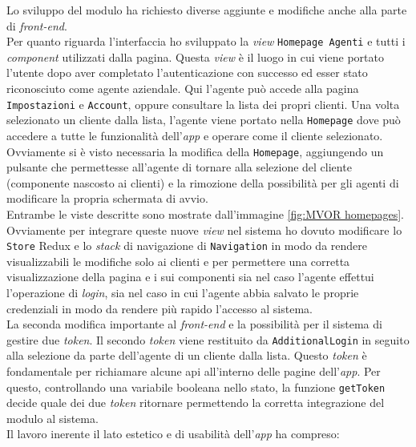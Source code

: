 Lo sviluppo del modulo ha richiesto diverse aggiunte e modifiche anche alla parte di \textit{front-end}.\\
Per quanto riguarda l'interfaccia ho sviluppato la \textit{view} \texttt{Homepage Agenti} e tutti i 
\textit{component} utilizzati dalla pagina. Questa \textit{view} è il luogo in cui viene portato l'utente 
dopo aver completato l'autenticazione con successo ed esser stato riconosciuto come agente aziendale. Qui 
l'agente può accede alla pagina \texttt{Impostazioni} e \texttt{Account}, oppure consultare la lista dei 
propri clienti. Una volta selezionato un cliente dalla lista, l'agente viene portato nella \texttt{Homepage} 
dove può accedere a tutte le funzionalità dell'\textit{app} e operare come il cliente selezionato.\\
Ovviamente si è visto necessaria la modifica della \texttt{Homepage}, aggiungendo un pulsante che permettesse 
all'agente di tornare alla selezione del cliente (componente nascosto ai clienti) e la rimozione della possibilità 
per gli agenti di modificare la propria schermata di avvio.\\
Entrambe le viste descritte sono mostrate dall'immagine \ref{fig:MVOR homepages}.\\
Ovviamente per integrare queste nuove \textit{view} nel sistema ho dovuto modificare lo \texttt{Store} Redux 
e lo \textit{stack} di navigazione di \texttt{Navigation} in modo da rendere visualizzabili le modifiche 
solo ai clienti e per permettere una corretta visualizzazione della pagina e i sui componenti sia nel caso 
l'agente effettui l'operazione di \textit{login}, sia nel caso in cui l'agente abbia salvato le proprie 
credenziali in modo da rendere più rapido l'accesso al sistema.\\
La seconda modifica importante al \textit{front-end} e la possibilità per il sistema di gestire due \textit{token}. 
Il secondo \textit{token} viene restituito da \texttt{AdditionalLogin} in seguito alla selezione da parte 
dell'agente di un cliente dalla lista. Questo \textit{token} è fondamentale per richiamare alcune \gls{api} all'interno 
delle pagine dell'\textit{app}. Per questo, controllando una variabile booleana nello stato, la funzione \texttt{getToken} 
decide quale dei due \textit{token} ritornare permettendo la corretta integrazione del modulo al sistema.\\
Il lavoro inerente il lato estetico e di usabilità dell'\textit{app} ha compreso:
